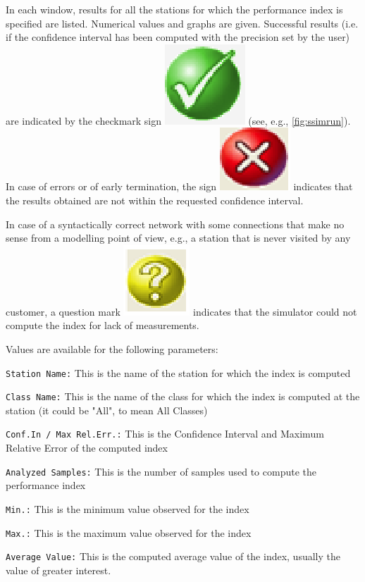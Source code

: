 In each window, results for all the stations for which the
performance index is specified are listed. Numerical values and
graphs are given. Successful results (i.e. if the confidence
interval has been computed with the precision set by the user) are
indicated by the checkmark sign \includegraphics[scale=.3]
{img/jsimg/tick} (see, e.g.,
\autoref{fig:ssimrun}). In case of errors or of early
termination, the sign \includegraphics[scale=.3]
{img/jsimg/cross2} indicates that the
results obtained are not within the requested confidence interval.

In case of a syntactically correct network with some connections
that make no sense from a modelling point of view, e.g., a station
that is never visited by any customer, a question mark \includegraphics[scale=.3]{img/jsimg/question}
indicates that the simulator could not
compute the index for lack of measurements.

Values are available for the following parameters:
\begin{itemize*}

\item \texttt{Station Name:} This is the name of the station for
which the index is computed \item \texttt{Class Name:} This is the
name of the class for which the index is computed at the station
(it could be "All", to mean All Classes) \item \texttt{Conf.In /
Max Rel.Err.:} This is the Confidence Interval and Maximum
Relative Error of the computed index \item \texttt{Analyzed
Samples:} This is the number of samples used to compute the
performance index \item  \texttt{Min.:} This is the minimum value
observed for the index \item \texttt{Max.:} This is the maximum
value observed for the index \item \texttt{Average Value:} This is
the computed average value of the index, usually the value of
greater interest.
\end{itemize*}


